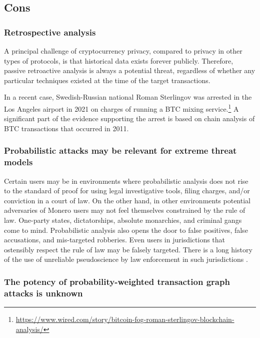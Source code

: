 \documentclass[english]{article}
\begin{document}
\subsection{Cons}

\subsubsection{Retrospective analysis}

A principal challenge of cryptocurrency privacy, compared to privacy
in other types of protocols, is that historical data exists forever
publicly. Therefore, passive retroactive analysis is always a potential
threat, regardless of whether any particular techniques existed at
the time of the target transactions.

In a recent case, Swedish-Russian national Roman Sterlingov was arrested
in the Los Angeles airport in 2021 on charges of running a BTC mixing
service.\footnote{\href{https://www.wired.com/story/bitcoin-fog-roman-sterlingov-blockchain-analysis/}{https://www.wired.com/story/bitcoin-fog-roman-sterlingov-blockchain-analysis/}}
A significant part of the evidence supporting the arrest is based
on chain analysis of BTC transactions that occurred in 2011.

\subsubsection{Probabilistic attacks may be relevant for extreme threat models}

Certain users may be in environments where probabilistic analysis
does not rise to the standard of proof for using legal investigative
tools, filing charges, and/or conviction in a court of law. On the
other hand, in other environments potential adversaries of Monero
users may not feel themselves constrained by the rule of law. One-party
states, dictatorships, absolute monarchies, and criminal gangs come
to mind. Probabilistic analysis also opens the door to false positives,
false accusations, and mis-targeted robberies. Even users in jurisdictions
that ostensibly respect the rule of law may be falsely targeted. There
is a long history of the use of unreliable pseudoscience by law enforcement
in such jurisdictions \cite{LilienfeldLandfield2008}.

\subsubsection{The potency of probability-weighted transaction graph attacks is
unknown}
\end{document}
